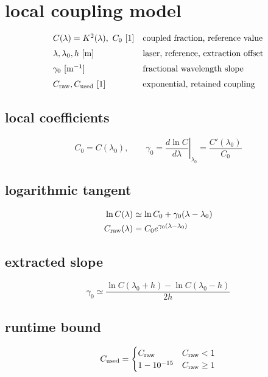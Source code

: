 \section*{local coupling model}
\[
\begin{array}{ll}C(\lambda)=K^2(\lambda),\ C_0\ [1]&\text{coupled fraction, reference value}\\[0.6em]\lambda,\lambda_0,h\ [\mathrm m]&\text{laser, reference, extraction offset}\\[0.6em]\gamma_0\ [\mathrm{m^{-1}}]&\text{fractional wavelength slope}\\[0.6em]C_{\rm raw},C_{\rm used}\ [1]&\text{exponential, retained coupling}\end{array}
\]
\subsection*{local coefficients}
\[
\displaystyle C_0=C(\lambda_0),\qquad\gamma_0=\left.\frac{d\ln C}{d\lambda}\right|_{\lambda_0}=\frac{C'(\lambda_0)}{C_0}
\]
\subsection*{logarithmic tangent}
\[
\displaystyle \begin{aligned}\ln C(\lambda)&\simeq\ln C_0+\gamma_0(\lambda-\lambda_0)\\C_{\rm raw}(\lambda)&=C_0e^{\gamma_0(\lambda-\lambda_0)}\end{aligned}
\]
\subsection*{extracted slope}
\[
\displaystyle \gamma_0\simeq\frac{\ln C(\lambda_0+h)-\ln C(\lambda_0-h)}{2h}
\]
\subsection*{runtime bound}
\[
\displaystyle C_{\rm used}=\begin{cases}C_{\rm raw}&C_{\rm raw}<1\\1-10^{-15}&C_{\rm raw}\ge1\end{cases}
\]
